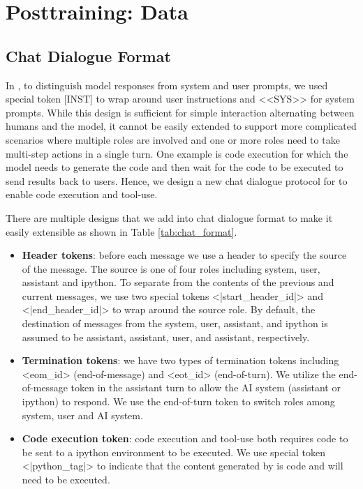 \section{Posttraining: Data}
\label{appendix:posttraining}

\subsection{Chat Dialogue Format}\label{subsubsec:chat_format}
In \llamatwo, to distinguish model responses from system and user prompts, we used special token [INST] to wrap around user instructions and <<SYS>> for system prompts. While this design is sufficient for simple interaction alternating between humans and the model, it cannot be easily extended to support more complicated scenarios where multiple roles are involved and one or more roles need to take multi-step actions in a single turn. One example is code execution for which the model needs to generate the code and then wait for the code to be executed to send results back to users. Hence, we design a new chat dialogue protocol for \llamathree to enable code execution and tool-use.

There are multiple designs that we add into \llamathree chat dialogue format to make it easily extensible as shown in Table \ref{tab:chat_format}.

\begin{itemize}
    \item \textbf{Header tokens}: before each message we use a header to specify the source of the message. The source is one of four roles including system, user, assistant and ipython. To separate from the contents of the previous and current messages, we use two special tokens <|start\_header\_id|> and <|end\_header\_id|> to wrap around the source role. By default, the destination of messages from the system, user, assistant, and ipython is assumed to be assistant, assistant, user, and assistant, respectively.
    \item \textbf{Termination tokens}: we have two types of termination tokens including <eom\_id> (end-of-message) and <eot\_id> (end-of-turn). We utilize the end-of-message token in the assistant turn to allow the AI system (assistant or ipython) to respond. We use the end-of-turn token to switch roles among system, user and AI system.
    \item \textbf{Code execution token}: code execution and tool-use both requires code to be sent to a ipython environment to be executed. We use special token <|python\_tag|> to indicate that the content generated by \llamathree is code and will need to be executed.
\end{itemize}

